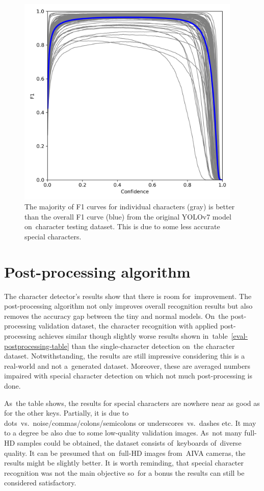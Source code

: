 \begin{figure}[hbt]
    \includegraphics[width=0.95\textwidth]{img/evaluation/eval-char-f1.png}
    \caption{The majority of F1 curves for individual characters (gray) is better than the overall F1 curve (blue) from the original YOLOv7 model on~character testing dataset. This is due to some less accurate special characters.}
    \label{eval-char-f1}
\end{figure}

\section{Post-processing algorithm}
\label{evaluation-postprocessing}
The character detector's results show that there is room for~improvement. The post-processing algorithm not only improves overall recognition results but also removes the accuracy gap between the tiny and normal models. On~the post-processing validation dataset, the character recognition with applied post-processing achieves similar though slightly worse results shown in~table~\ref{eval-postprocessing-table} than the single-character detection on~the \hbox{character} dataset. Notwithstanding, the results are still impressive considering this is a real-world and not a~generated dataset. Moreover, these are averaged numbers impaired with special character detection on which not much post-processing is done.

As~the table shows, the results for special characters are nowhere near as good as for the other keys. Partially, it is due to dots~vs.~noise/commas/colons/semicolons or underscores~vs.~dashes etc. It may to a degree be also due to some low-quality validation images. As~not many full-HD samples could be obtained, the dataset consists of~keyboards of~diverse quality. It can be presumed that on~full-HD images from~AIVA cameras, the results might be slightly better. It is worth reminding, that special character recognition was not the main objective so~for a bonus the results can still be considered satisfactory.

